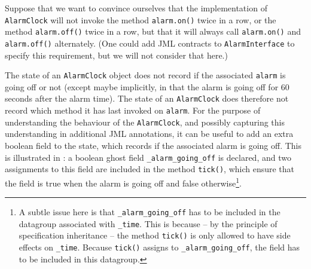 \documentclass{llncs}
\begin{document}
% 
% 
% 
% 
% 

\medskip

Suppose that we want to convince ourselves that the implementation of 
\texttt{AlarmClock} will not invoke the method \texttt{alarm.on()}
twice in a row, or the method \texttt{alarm.off()} twice in a row,
but that it will always call \texttt{alarm.on()} and \texttt{alarm.off()}
 alternately. 
(One could add JML contracts to \texttt{AlarmInterface} to specify this
requirement, but we will not consider that here.)

The state of an \texttt{AlarmClock} object does not record if the associated
\texttt{alarm} is going off or not (except maybe implicitly, in that the alarm is 
going off for 60 seconds after the alarm time). The state of an \texttt{AlarmClock}
does therefore not record which method it has last invoked on \texttt{alarm}.
For the purpose of understanding the behaviour of the \texttt{AlarmClock}, 
and possibly capturing this understanding in additional JML annotations,
it can be useful to add an extra boolean field to the state, which records if 
the associated alarm is going off.
This is illustrated in :
a boolean ghost field \texttt{\_alarm\_going\_off} is declared, 
and two assignments to this field are included in the method \texttt{tick()},
which ensure that the field is true when the alarm is going off and false
otherwise\footnote{A subtle issue here is that \texttt{\_alarm\_going\_off} 
has to be included in the datagroup associated with \texttt{\_time}. This is 
because --  by the principle of specification inheritance -- the method 
\texttt{tick()} is only allowed to have side effects on \texttt{\_time}.
Because \texttt{tick()} assigns to \texttt{\_alarm\_going\_off}, the field
has to be included in this datagroup.}.
\end{document}
